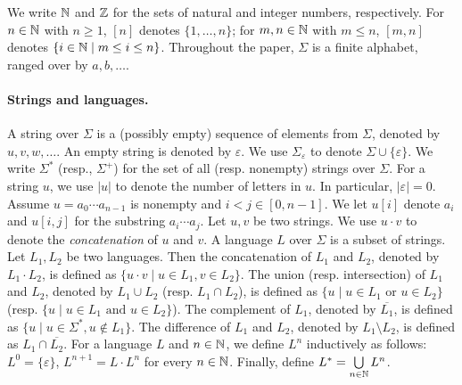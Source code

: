 %

We write $\mathbb{N}$ and $\mathbb{Z}$ for the sets of natural and integer numbers, respectively. For $n \in \mathbb{N}$ with $n \ge 1$, $[n]$ denotes $\{1, \ldots, n\}$; for $m,n \in \mathbb{N}$ with $m \le n$,  $[m, n]$ denotes $\{ i \in \mathbb{N} \mid m \le i \le n \}$. Throughout the paper, $\Sigma$ is a finite alphabet, ranged over by $a,b,\ldots$.  

\paragraph*{Strings and languages.}
A string over $\Sigma$ is a (possibly empty) sequence of elements from $\Sigma$,
denoted by $u, v, w, \ldots$. An empty string is denoted by $\varepsilon$. We use $\Sigma_\varepsilon$ to denote $\Sigma \cup \{\varepsilon\}$. We write $\Sigma^*$ (resp., $\Sigma^+$) for the set of all (resp. nonempty) strings over $\Sigma$.
For a string $u$, we use $|u|$ to denote the number of letters in $u$. In particular, $|\varepsilon|=0$. 
Assume $u=a_0\cdots a_{n-1}$ is nonempty and $i<j \in [0,n-1]$. %
We let $u[i]$ denote $a_i$ and $u[i,j]$ for the substring %
$a_i\cdots a_j$. 
%
Let $u, v$ be two strings. We use $u \cdot v$ to denote the \emph{concatenation} of $u$ and $v$. A language $L$ over $\Sigma$ is a subset of strings.  
Let $L_1, L_2$ be two languages. Then the concatenation of $L_1$ and $L_2$, denoted by $L_1 \cdot L_2$,  is defined as $\{u \cdot v \mid u \in L_1, v \in L_2\}$. The union (resp. intersection) of $L_1$ and $L_2$, denoted by $L_1 \cup L_2$  (resp. $L_1 \cap L_2$), is defined as $\{u \mid u \in L_1 \mbox{ or } u \in L_2\}$ (resp. $\{u \mid u \in L_1 \mbox{ and } u \in L_2\}$). The complement of $L_1$, denoted by $\overline{L_1}$, is defined as $\{u \mid u \in \Sigma^*, u \not \in L_1\}$. 
The difference of $L_1$ and $L_2$, denoted by $L_1 \setminus L_2$, is defined as $L_1 \cap \overline{L_2}$. 
For a language $L$ and $n \in \mathbb{N}$, we define $L^n$ inductively as follows: $L^0= \{\varepsilon\}$, $L^{n+1} = L \cdot L^n$ for every $n \in \mathbb{N}$. 
Finally, define $L^* = \bigcup \limits_{n \in \mathbb{N}} L^n$.

